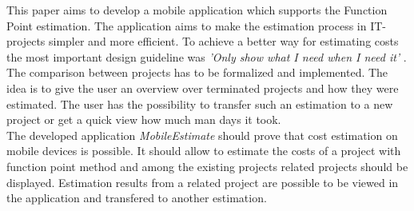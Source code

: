 This paper aims to develop a mobile application which supports the Function Point estimation. The application aims to make the estimation process in IT-projects simpler and more efficient. To achieve a better way for estimating costs the most important design guideline was \textit{'Only show what I need when I need it'} \cite{materialdesign}. The comparison between projects has to be formalized and implemented. The idea is to give the user an overview over terminated projects and how they were estimated. The user has the possibility to transfer such an estimation to a new project or get a quick view how much man days it took.\\
The developed application \textit{MobileEstimate} should prove that cost estimation on mobile devices is possible. It should allow to estimate the costs of a project with function point method and among the existing projects related projects should be displayed. Estimation results from a related project are possible to be viewed in the application and transfered to another estimation.\\

